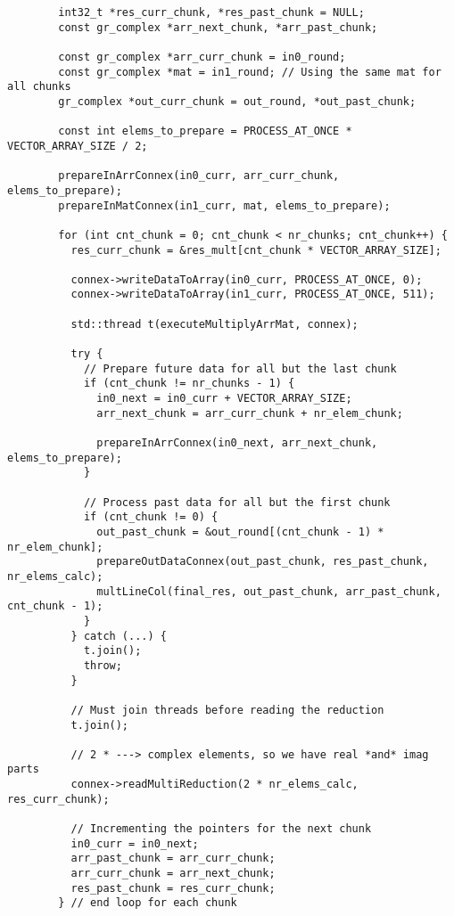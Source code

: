 \begin{lstlisting}
        int32_t *res_curr_chunk, *res_past_chunk = NULL;
        const gr_complex *arr_next_chunk, *arr_past_chunk;

        const gr_complex *arr_curr_chunk = in0_round;
        const gr_complex *mat = in1_round; // Using the same mat for all chunks
        gr_complex *out_curr_chunk = out_round, *out_past_chunk;

        const int elems_to_prepare = PROCESS_AT_ONCE * VECTOR_ARRAY_SIZE / 2;

        prepareInArrConnex(in0_curr, arr_curr_chunk, elems_to_prepare);
        prepareInMatConnex(in1_curr, mat, elems_to_prepare);

        for (int cnt_chunk = 0; cnt_chunk < nr_chunks; cnt_chunk++) {
          res_curr_chunk = &res_mult[cnt_chunk * VECTOR_ARRAY_SIZE];

          connex->writeDataToArray(in0_curr, PROCESS_AT_ONCE, 0);
          connex->writeDataToArray(in1_curr, PROCESS_AT_ONCE, 511);

          std::thread t(executeMultiplyArrMat, connex);

          try {
            // Prepare future data for all but the last chunk
            if (cnt_chunk != nr_chunks - 1) {
              in0_next = in0_curr + VECTOR_ARRAY_SIZE;
              arr_next_chunk = arr_curr_chunk + nr_elem_chunk;

              prepareInArrConnex(in0_next, arr_next_chunk, elems_to_prepare);
            }

            // Process past data for all but the first chunk
            if (cnt_chunk != 0) {
              out_past_chunk = &out_round[(cnt_chunk - 1) * nr_elem_chunk];
              prepareOutDataConnex(out_past_chunk, res_past_chunk, nr_elems_calc);
              multLineCol(final_res, out_past_chunk, arr_past_chunk, cnt_chunk - 1);
            }
          } catch (...) {
            t.join();
            throw;
          }

          // Must join threads before reading the reduction
          t.join();

          // 2 * ---> complex elements, so we have real *and* imag parts
          connex->readMultiReduction(2 * nr_elems_calc, res_curr_chunk);

          // Incrementing the pointers for the next chunk
          in0_curr = in0_next;
          arr_past_chunk = arr_curr_chunk;
          arr_curr_chunk = arr_next_chunk;
          res_past_chunk = res_curr_chunk;
        } // end loop for each chunk


\end{lstlisting}
